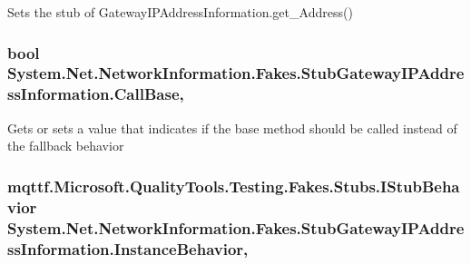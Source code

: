 Sets the stub of Gateway\-I\-P\-Address\-Information.\-get\-\_\-\-Address()

\hypertarget{class_system_1_1_net_1_1_network_information_1_1_fakes_1_1_stub_gateway_i_p_address_information_a880d76a763481489a494e99903f1416b}{
\subsubsection[{Call\-Base}]{\setlength{\rightskip}{0pt plus 5cm}bool System.\-Net.\-Network\-Information.\-Fakes.\-Stub\-Gateway\-I\-P\-Address\-Information.\-Call\-Base\hspace{0.3cm}{\ttfamily [get]}, {\ttfamily [set]}}}\label{class_system_1_1_net_1_1_network_information_1_1_fakes_1_1_stub_gateway_i_p_address_information_a880d76a763481489a494e99903f1416b}


Gets or sets a value that indicates if the base method should be called instead of the fallback behavior

\hypertarget{class_system_1_1_net_1_1_network_information_1_1_fakes_1_1_stub_gateway_i_p_address_information_a73cba9e166b9dd22362dda58c80192fd}{
\subsubsection[{Instance\-Behavior}]{\setlength{\rightskip}{0pt plus 5cm}mqttf.\-Microsoft.\-Quality\-Tools.\-Testing.\-Fakes.\-Stubs.\-I\-Stub\-Behavior System.\-Net.\-Network\-Information.\-Fakes.\-Stub\-Gateway\-I\-P\-Address\-Information.\-Instance\-Behavior\hspace{0.3cm}{\ttfamily [get]}, {\ttfamily [set]}}}\label{class_system_1_1_net_1_1_network_information_1_1_fakes_1_1_stub_gateway_i_p_address_information_a73cba9e166b9dd22362dda58c80192fd}


